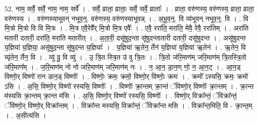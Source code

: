 \documentclass[17pt]{extarticle}
\begin{document}
52. नाम॒ सर्वे॒ सर्वे॒ नाम॒ नाम॒ सर्वे᳚ । . सर्वे॒ व्राता॒ व्राताः॒ सर्वे॒ सर्वे॒ व्राताः᳚ । . व्राता॒ वरु॑णस्य॒ वरु॑णस्य॒ व्राता॒ व्राता॒ वरु॑णस्य । . वरु॑णस्याभूवन् नभूव॒न्॒. वरु॑णस्य॒ वरु॑णस्याभूवन्न् । . अ॒भू॒व॒न्॒. वि व्य॑भूवन् नभूव॒न्॒. वि । . वि मि॒त्रो मि॒त्रो वि वि मि॒त्रः । . मि॒त्र एवै॒रेवै᳚र् मि॒त्रो मि॒त्र एवैः᳚ । . एवै॒ ररा॑ति॒ मरा॑ति॒ मेवै॒ रेवै॒ ररा॑तिम् । . अरा॑ति मतारी दतारी॒ दरा॑ति॒ मरा॑ति मतारीत् । . अ॒ता॒री॒ दसू॑षुद॒न्ता सू॑षुदन्तातारी दतारी॒ दसू॑षुदन्त । . असू॑षुदन्त य॒ज्ञिया॑ य॒ज्ञिया॒ असू॑षुद॒न्ता सू॑षुदन्त य॒ज्ञियाः᳚ । . य॒ज्ञिया॑ ऋ॒तेन॒ र्तेन॑ य॒ज्ञिया॑ य॒ज्ञिया॑ ऋ॒तेन॑ । . ऋ॒तेन॒ वि व्यृ॑तेन॒ र्तेन॒ वि । . व्यु॑ वु॒ वि व्यु॑ । . उ॒ त्रि॒त स्त्रि॒त उ॑ वु त्रि॒तः । . त्रि॒तो ज॑रि॒माण॑म् जरि॒माण॑म् त्रि॒तस्त्रि॒तो ज॑रि॒माण᳚म् । . ज॒रि॒माण॑म् नो नो जरि॒माण॑म् जरि॒माण॑म् नः । . न॒ आ॒न॒ डा॒न॒ण् णो॒ न॒ आ॒न॒ट् । . आ॒न॒ड् विष्णो॒र् विष्णो॑ रान डान॒ड् विष्णोः᳚ । . विष्णोः॒ क्रमः॒ क्रमो॒ विष्णो॒र् विष्णोः॒ क्रमः॑ । . क्रमो᳚ ऽस्यसि॒ क्रमः॒ क्रमो॑ ऽसि । . अ॒सि॒ विष्णो॒र् विष्णो॑ रस्यसि॒ विष्णोः᳚ । . विष्णोः᳚ क्रा॒न्तम् क्रा॒न्तं ॅविष्णो॒र् विष्णोः᳚ क्रा॒न्तम् । . क्रा॒न्त म॑स्यसि क्रा॒न्तम् क्रा॒न्त म॑सि । . अ॒सि॒ विष्णो॒र् विष्णो॑ रस्यसि॒ विष्णोः᳚ । . विष्णो॒र् विक्रा᳚न्तं॒ ॅविक्रा᳚न्तं॒ ॅविष्णो॒र् विष्णो॒र् विक्रा᳚न्तम् । . विक्रा᳚न्त मस्यसि॒ विक्रा᳚न्तं॒ ॅविक्रा᳚न्त मसि । . विक्रा᳚न्त॒मिति॒ वि - क्रा॒न्त॒म् । . अ॒सीत्य॑सि । \newline
\end{document}
